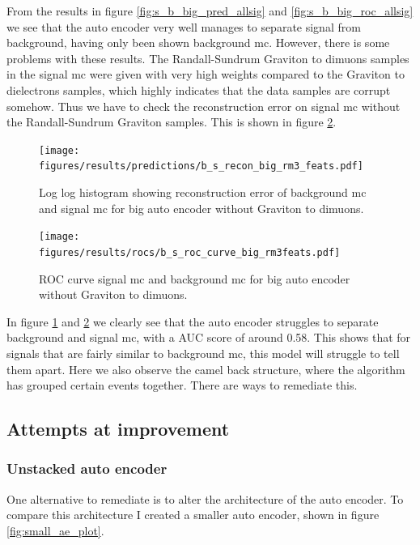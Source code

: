 \documentclass[ reprint, amsmath,amssymb, aps, nofootinbib]{revtex4-2}
\begin{document}
From the results in figure \ref{fig:s_b_big_pred_allsig} and \ref{fig:s_b_big_roc_allsig} we see that the auto encoder very well manages to separate signal from background, having only been shown background mc. However, there is some problems with these results. The Randall-Sundrum Graviton to dimuons samples in the signal mc were given with very high weights compared to the Graviton to dielectrons samples, which highly indicates that the data samples are corrupt somehow. Thus we have to check the reconstruction error on signal mc without the Randall-Sundrum Graviton samples. This is shown in figure \ref{fig:roc_sig_big_allsig_nogmumu}.


\begin{figure}[H]    
     \centering
    \texttt{[image: figures/results/predictions/b\_s\_recon\_big\_rm3\_feats.pdf]}
    \caption{Log log histogram showing reconstruction error of background mc and signal mc for big auto encoder without Graviton to dimuons.  }
    \label{fig:s_b_big_allsig_nogmumu}
\end{figure}

\begin{figure}[H]    
  \centering
         \texttt{[image: figures/results/rocs/b\_s\_roc\_curve\_big\_rm3feats.pdf]}
         \caption{ROC curve signal mc and background mc for big auto encoder without Graviton to dimuons. }
         \label{fig:roc_sig_big_allsig_nogmumu}
\end{figure}



In figure \ref{fig:s_b_big_allsig_nogmumu} and \ref{fig:roc_sig_big_allsig_nogmumu} we clearly see that the auto encoder struggles to separate background and signal mc, with a AUC score of around 0.58. This shows that for signals that are fairly similar to background mc, this model will struggle to tell them apart. Here we also observe the camel back structure, where the algorithm has grouped certain events together. There are ways to remediate this.

\subsection{Attempts at improvement}

\subsubsection{Unstacked auto encoder}

One alternative to remediate is to alter the architecture of the auto encoder. To compare this architecture I created a smaller auto encoder, shown in figure \ref{fig:small_ae_plot}.
\end{document}
